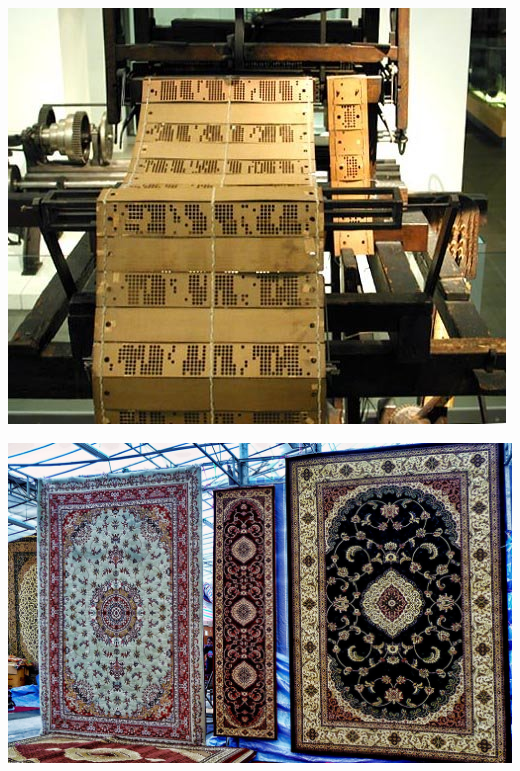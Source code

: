 \begin{center}
	\includegraphics[height=.9\textheight]{./IMG/Figura-14-Cartoes-perfurados-em-um-tear-ou-maquina-de-Jacquard.png}
\end{center}

\vfill
\pagebreak

\begin{center}
	\includegraphics[height=\textheight]{./IMG/tapete.jpeg}
\end{center}

\vfill
\pagebreak
